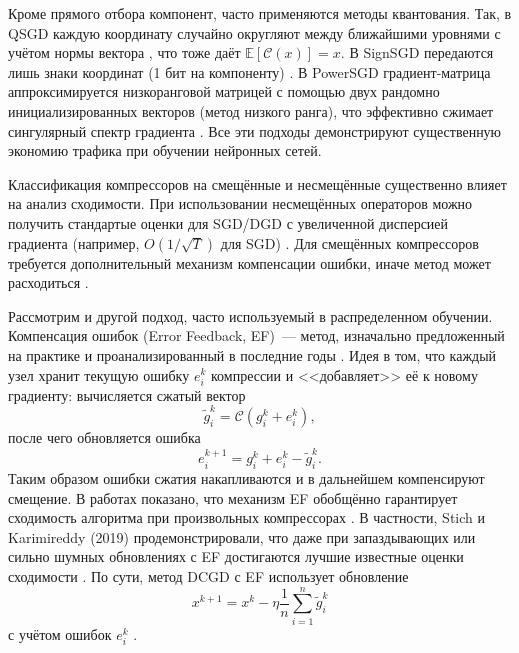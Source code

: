     Кроме прямого отбора компонент, часто применяются методы квантования. Так, в QSGD каждую координату случайно округляют между ближайшими уровнями с учётом нормы вектора \cite{alistarh2017qsgdcommunicationefficientsgdgradient}, что тоже даёт $\mathbb{E}[\mathcal{C}(x)] = x$. В SignSGD передаются лишь знаки координат (1 бит на компоненту) \cite{bernstein2018signsgdcompressedoptimisationnonconvex}. В PowerSGD градиент-матрица аппроксимируется низкоранговой матрицей с помощью двух рандомно инициализированных векторов (метод низкого ранга), что эффективно сжимает сингулярный спектр градиента \cite{vogels2020powersgdpracticallowrankgradient}. Все эти подходы демонстрируют существенную экономию трафика при обучении нейронных сетей.

    Классификация компрессоров на смещённые и несмещённые существенно влияет на анализ сходимости. При использовании несмещённых операторов можно получить стандартые оценки для SGD/DGD с увеличенной дисперсией градиента (например, $O(1/\sqrt{T})$ для SGD) \cite{alistarh2017qsgdcommunicationefficientsgdgradient,horvath2022naturalcompressiondistributeddeep}. Для смещённых компрессоров требуется дополнительный механизм компенсации ошибки, иначе метод может расходиться \cite{beznosikov2024biasedcompressiondistributedlearning}. 


    Рассмотрим и другой подход, часто используемый в распределенном обучении. Компенсация ошибок (Error Feedback, EF)~--- метод, изначально предложенный на практике и проанализированный в последние годы \cite{stich2021errorfeedbackframeworkbetterrates,beznosikov2024biasedcompressiondistributedlearning}. Идея в том, что каждый узел хранит текущую ошибку $e_i^k$ компрессии и <<добавляет>> её к новому градиенту: вычисляется сжатый вектор
    \begin{equation}
        \widetilde{g}_i^k = \mathcal{C}\left(g_i^k + e_i^k\right),
    \end{equation}
    после чего обновляется ошибка
    \begin{equation}
        e_i^{k+1} = g_i^k + e_i^k - \widetilde{g}_i^k.
    \end{equation}
    Таким образом ошибки сжатия накапливаются и в дальнейшем компенсируют смещение. В работах показано, что механизм EF обобщённо гарантирует сходимость алгоритма при произвольных компрессорах \cite{stich2021errorfeedbackframeworkbetterrates,vogels2020powersgdpracticallowrankgradient}. В частности, Stich и Karimireddy (2019) продемонстрировали, что даже при запаздывающих или сильно шумных обновлениях с EF достигаются лучшие известные оценки сходимости \cite{stich2021errorfeedbackframeworkbetterrates}. По сути, метод DCGD с EF использует обновление
    \begin{equation}
        x^{k+1} = x^k - \eta \frac{1}{n}\sum_{i=1}^n \widetilde{g}_i^k
    \end{equation}
    с учётом ошибок $e_i^k$ \cite{vogels2020powersgdpracticallowrankgradient,beznosikov2024biasedcompressiondistributedlearning}. 

